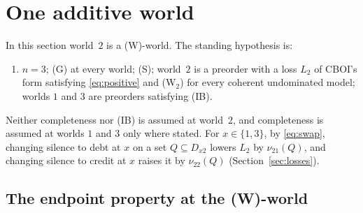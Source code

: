 \documentclass[11pt]{article}
\theoremstyle{definition}\newtheorem{definition}[theorem]{Definition}
\theoremstyle{remark}\newtheorem{remark}[theorem]{Remark}
\begin{document}
\section{One additive world}\label{sec:onew}

In this section world~$2$ is a (W)-world. The standing hypothesis is:
\begin{enumerate}[label=(OW),leftmargin=*]
\item $n=3$; (G) at every world; (S); world~$2$ is a preorder with a loss
$L_2$ of CBOI's form satisfying \eqref{eq:positive} and (W$_2$) for every
coherent undominated model; worlds $1$ and $3$ are preorders satisfying
(IB).
\end{enumerate}
Neither completeness nor (IB) is assumed at world~$2$, and completeness is
assumed at worlds $1$ and $3$ only where stated. For $x\in\{1,3\}$, by
\eqref{eq:swap}, changing silence to debt at $x$ on a set $Q\subseteq
D_{x2}$ lowers $L_2$ by $\nu_{21}(Q)$, and changing silence to credit at $x$
raises it by $\nu_{22}(Q)$ (Section~\ref{sec:losses}).

\subsection{The endpoint property at the (W)-world}\label{sec:EP}
\end{document}
